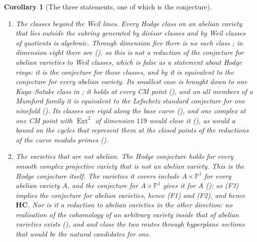 \documentclass[11pt,reqno]{amsart}
\theoremstyle{plain}
\newtheorem{corollary}[theorem]{Corollary}
\theoremstyle{definition}
\theoremstyle{remark}
\newcommand{\PP}{\mathbb{P}}
\DeclareMathOperator{\Ext}{Ext}
\begin{document}
\begin{corollary}[The three statements, one of which is the
conjecture]
\begin{enumerate}[label=\textup{(F\arabic*)},leftmargin=3.0em,itemsep=4pt]
  \cite[Theorem~3.9]{paperII} computes the number that $\dim\Ext^{2}(E,E)$ has
  to reach, $7n^{2}-2n$ for a general shape. For one family its
  conclusion is equivalent to the Lefschetz standard conjecture for one
  variety (). The bounded criterion \textup{(P1)} is not a
  second form of the same demand: by
  \cite[Theorem~16.17]{paperI} it is equivalent to the conclusion it was to imply,
  and \cite[Theorem~16.15]{paperI} shows that the one cycle it could have been tested
  on, the transport of the base cycle, does not satisfy it.
\item \emph{The classes beyond the Weil lines.} Every Hodge class on an
  abelian variety that lies outside the subring generated by divisor classes
  and by Weil classes of quotients is algebraic. Through dimension five there
  is no such class \cite{MZ99}; in dimension eight there are
  (), so this is not a reduction of the conjecture
  for abelian varieties to Weil classes, which is false as a statement about
  Hodge rings: it is the conjecture for those classes, and by
   it is equivalent to the conjecture for every abelian
  variety. Its smallest case is
  brought down to one Kuga--Satake class in ; it holds at
  every CM point (), and on all members of a Mumford
  family it is equivalent to the Lefschetz standard conjecture for one
  ninefold (). Its classes are rigid along the base
  curve (), and one complex at one CM point with
  $\Ext^{2}$ of dimension $119$ would close it (),
  as would a bound on the cycles that represent them at the closed points of
  the reductions of the curve modulo primes ().
\item \emph{The varieties that are not abelian.} The Hodge conjecture holds
  for every smooth complex projective variety that is not an abelian variety.
  This is the Hodge conjecture itself. The varieties it covers include
  $A\times\PP^{1}$ for every abelian variety $A$, and the conjecture for
  $A\times\PP^{1}$ gives it for $A$ (); so (F3) implies
  the conjecture for abelian varieties, hence (F1) and (F2), and hence
  $\mathbf{HC}$. Nor is it a reduction to abelian varieties in the other
  direction: no realisation of the cohomology of an arbitrary variety inside
  that of abelian varieties exists (), and
  \cite[Theorem~10.3]{paperI} and \cite[Theorem~10.8]{paperI} close the two routes
  through hyperplane sections that would be the natural candidates for one.
\end{enumerate}
\end{corollary}
\end{document}
